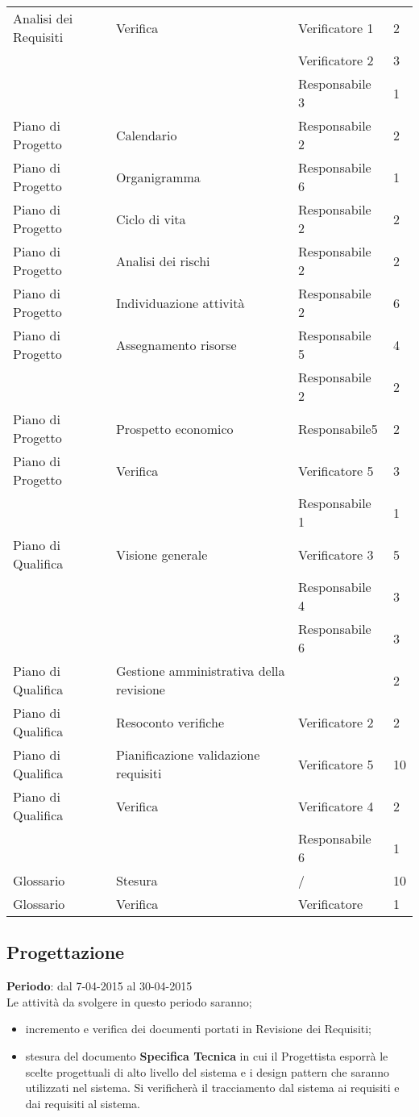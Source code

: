 {{\begin{longtable} [c]{| l | l | l | l |}
		Analisi dei Requisiti & Verifica & Verificatore 1 & 2\\
		&	&	Verificatore 2 & 3\\
		&	&	Responsabile 3 & 1\\
		Piano di Progetto & Calendario & Responsabile 2 & 2\\
		Piano di Progetto & Organigramma & Responsabile 6 & 1\\
		Piano di Progetto & Ciclo di vita & Responsabile 2 & 2\\
		Piano di Progetto & Analisi dei rischi & Responsabile 2 & 2\\
		Piano di Progetto & Individuazione attività & Responsabile 2 & 6\\
		Piano di Progetto & Assegnamento risorse & Responsabile 5 & 4\\
		&	&	Responsabile 2 & 2\\
		Piano di Progetto & Prospetto economico & Responsabile5 & 2\\
		Piano di Progetto & Verifica &  Verificatore 5 & 3\\
		&	&	Responsabile 1 & 1\\
		Piano di Qualifica & Visione generale & Verificatore 3 & 5\\
		&	&	Responsabile 4 & 3\\
		&	&	Responsabile 6 & 3\\
		Piano di Qualifica & Gestione amministrativa della revisione & & 2\\
		Piano di Qualifica & Resoconto verifiche & Verificatore 2 & 2\\
		Piano di Qualifica & Pianificazione validazione requisiti & Verificatore 5 & 10\\
		Piano di Qualifica & Verifica & Verificatore 4 & 2\\
		&	&	Responsabile 6 & 1\\
		Glossario & Stesura & / & 10\\
		Glossario & Verifica & Verificatore & 1\\
	\end{longtable}
}
\subsection{Progettazione}{
	\textbf{Periodo}: dal 7-04-2015 al 30-04-2015 \\
	
	Le attività da svolgere in questo periodo saranno;
	\begin{itemize}
		\item incremento e verifica dei documenti portati in Revisione dei Requisiti;
		\item stesura del documento \textbf{Specifica Tecnica} in cui il Progettista esporrà le scelte progettuali di alto livello del sistema e i design pattern che saranno utilizzati nel sistema. Si verificherà il tracciamento dal sistema ai requisiti e dai requisiti al sistema.
	\end{itemize}
	
}}
